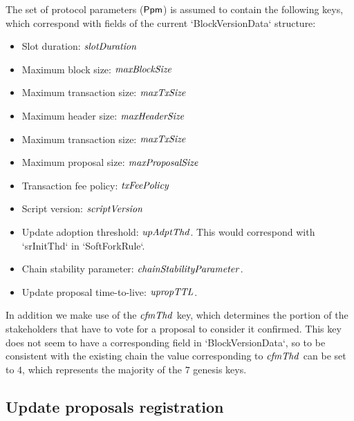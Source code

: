 The set of protocol parameters ($\mathsf{Ppm}$) is assumed to contain the following keys, which
correspond with fields of the current `BlockVersionData` structure:
\begin{itemize}
\item Slot duration: $\mathit{slotDuration}$
\item Maximum block size: $\mathit{maxBlockSize}$
\item Maximum transaction size: $\mathit{maxTxSize}$
\item Maximum header size: $\mathit{maxHeaderSize}$
\item Maximum transaction size: $\mathit{maxTxSize}$
\item Maximum proposal size: $\mathit{maxProposalSize}$
\item Transaction fee policy: $\mathit{txFeePolicy}$
\item Script version: $\mathit{scriptVersion}$
\item Update adoption threshold: $\mathit{upAdptThd}$. This would correspond with
  `srInitThd` in `SoftForkRule`.
\item Chain stability parameter: $\mathit{chainStabilityParameter}$.
\item Update proposal time-to-live: $\mathit{upropTTL}$.
\end{itemize}
In addition we make use of the $\mathit{cfmThd}$ key, which determines the portion
of the stakeholders that have to vote for a proposal to consider it confirmed.
This key does not seem to have a corresponding field in `BlockVersionData`, so
to be consistent with the existing chain the value corresponding to
$\mathit{cfmThd}$ can be set to $4$, which represents the majority of the $7$
genesis keys.

\subsection{Update proposals registration}
\label{sec:update-proposals-registration}

